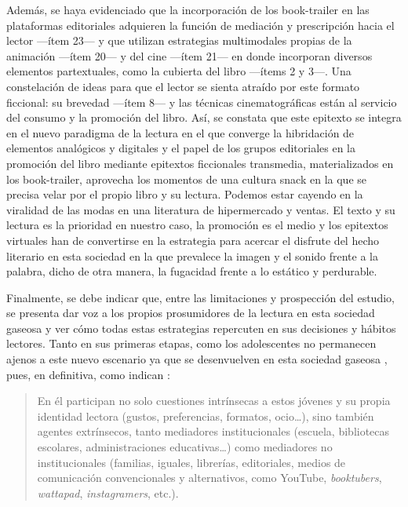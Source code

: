 \documentclass[spanish]{textolivre}
\begin{document}
Además, se haya evidenciado que la incorporación de los book-trailer en las plataformas editoriales adquieren la función de mediación y prescripción hacia el lector —ítem 23— y que utilizan estrategias multimodales propias de la animación —ítem 20— y del cine —ítem 21— en donde incorporan diversos elementos partextuales, como la cubierta del libro —ítems 2 y 3—. Una constelación de ideas para que el lector se sienta atraído por este formato ficcional: su brevedad —ítem 8— y las técnicas cinematográficas están al servicio del consumo y la promoción del libro. Así, se constata que este epitexto se integra en el nuevo paradigma de la lectura en el que converge la hibridación de elementos analógicos y digitales \cite{wolf2020,kovac2020lectura} y el papel de los grupos editoriales en la promoción del libro mediante epitextos ficcionales transmedia, materializados en los book-trailer, aprovecha los momentos de una cultura snack \cite{scolari2021} en la que se precisa velar por el propio libro y su lectura. Podemos estar cayendo en la viralidad de las modas en una literatura de hipermercado y ventas. El texto y su lectura es la prioridad en nuestro caso, la promoción es el medio y los epitextos virtuales han de convertirse en la estrategia para acercar el disfrute del hecho literario en esta sociedad en la que prevalece la imagen y el sonido frente a la palabra, dicho de otra manera, la fugacidad frente a lo estático y perdurable. 

Finalmente, se debe indicar que, entre las limitaciones y prospección del estudio, se presenta dar voz a los propios prosumidores de la lectura en esta sociedad gaseosa y ver cómo todas estas estrategias repercuten en sus decisiones y hábitos lectores. Tanto en sus primeras etapas, como los adolescentes no permanecen ajenos a este nuevo escenario ya que se desenvuelven en esta sociedad gaseosa \cite{scolari2021}, pues, en definitiva, como indican \textcite[p. 19-20]{romero_oliva_habitos_2020}:


\begin{quote}
    En él participan no solo cuestiones intrínsecas a estos jóvenes y su propia identidad lectora (gustos, preferencias, formatos, ocio…), sino también agentes extrínsecos, tanto mediadores institucionales (escuela, bibliotecas escolares, administraciones educativas…) como mediadores no institucionales (familias, iguales, librerías, editoriales, medios de comunicación convencionales y alternativos, como YouTube, \emph{booktubers}, \emph{wattapad}, \emph{instagramers}, etc.).
\end{quote}
\end{document}
